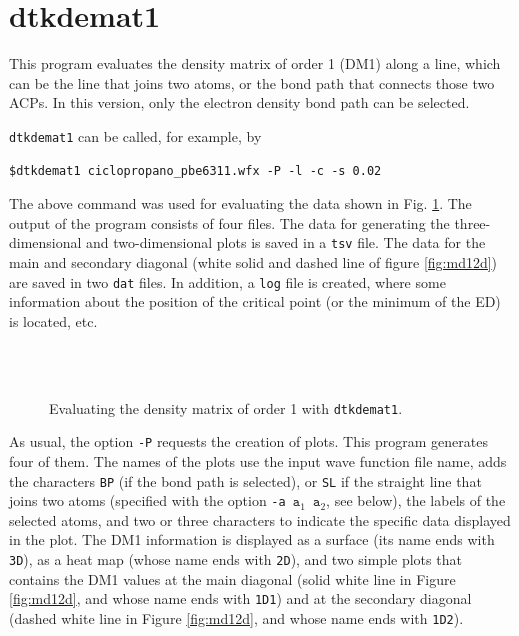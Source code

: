 \section{dtkdemat1}

This program evaluates the density matrix of order 1 (DM1) along a line, which can be the line that joins two atoms, or the bond path that connects those two ACPs. In this version, only the electron density bond path can be selected. 

\texttt{dtkdemat1} can be called, for example, by\\
\begin{lstlisting}
$dtkdemat1 ciclopropano_pbe6311.wfx -P -l -c -s 0.02
\end{lstlisting}

The above command was used for evaluating the data shown in Fig. \ref{fig:dtkdemat1usex}. The output of the program consists of four files. The data for generating the three-dimensional and two-dimensional plots is saved in a \texttt{tsv} file. The data for the main and secondary diagonal (white solid and dashed line of figure \ref{fig:md12d}) are saved in two \texttt{dat} files. In addition, a \texttt{log} file is created, where some information about the position of the critical point (or the minimum of the ED) is located, etc.
%
\begin{figure}[hb!]
\centering
{}\quad
{}\\
\quad
{}\\
\caption{Evaluating the density matrix of order 1 with \texttt{dtkdemat1}.}\label{fig:dtkdemat1usex}
\end{figure}
%

As usual, the option \texttt{-P} requests the creation of plots. This program generates four of them. The names of the plots use the input wave function file name, adds the characters \texttt{BP} (if the bond path is selected), or \texttt{SL} if the straight line that joins two atoms (specified with the option \texttt{-a $\mathtt{a}_1$ $\mathtt{a}_2$}, see below), the labels of the selected atoms, and two or three characters to indicate the specific data displayed in the plot. The DM1 information is displayed as a surface (its name ends with \texttt{3D}), as a heat map (whose name ends with \texttt{2D}), and two simple plots that contains the DM1 values at the main diagonal (solid white line in Figure \ref{fig:md12d}, and whose name ends with \texttt{1D1}) and at the secondary diagonal (dashed white line in Figure \ref{fig:md12d}, and whose name ends with \texttt{1D2}).

